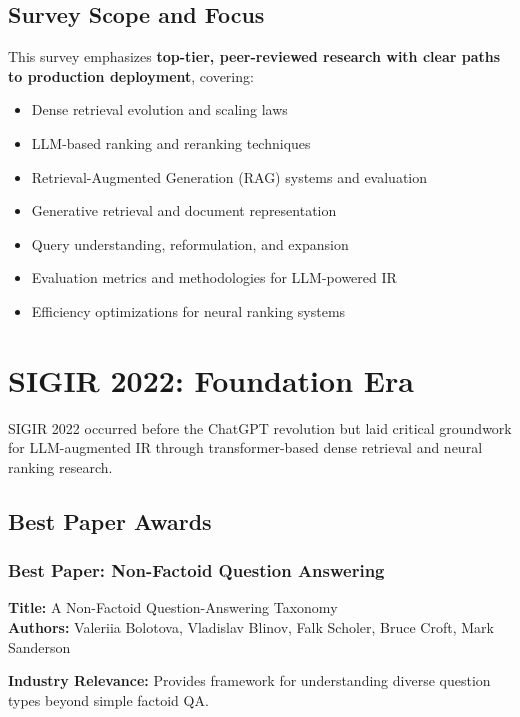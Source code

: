 \documentclass[11pt,letterpaper]{article}
\begin{document}
\subsection{Survey Scope and Focus}

This survey emphasizes \textbf{top-tier, peer-reviewed research with clear paths to production deployment}, covering:

\begin{itemize}[leftmargin=*]
    \item Dense retrieval evolution and scaling laws
    \item LLM-based ranking and reranking techniques
    \item Retrieval-Augmented Generation (RAG) systems and evaluation
    \item Generative retrieval and document representation
    \item Query understanding, reformulation, and expansion
    \item Evaluation metrics and methodologies for LLM-powered IR
    \item Efficiency optimizations for neural ranking systems
\end{itemize}

\newpage

\section{\textcolor{year2022}{SIGIR 2022: Foundation Era}}

SIGIR 2022 occurred before the ChatGPT revolution but laid critical groundwork for LLM-augmented IR through transformer-based dense retrieval and neural ranking research.

\subsection{Best Paper Awards}

\subsubsection{Best Paper: Non-Factoid Question Answering}
\textbf{Title:} A Non-Factoid Question-Answering Taxonomy\\
\textbf{Authors:} Valeriia Bolotova, Vladislav Blinov, Falk Scholer, Bruce Croft, Mark Sanderson

\textbf{Industry Relevance:} Provides framework for understanding diverse question types beyond simple factoid QA.
\end{document}
